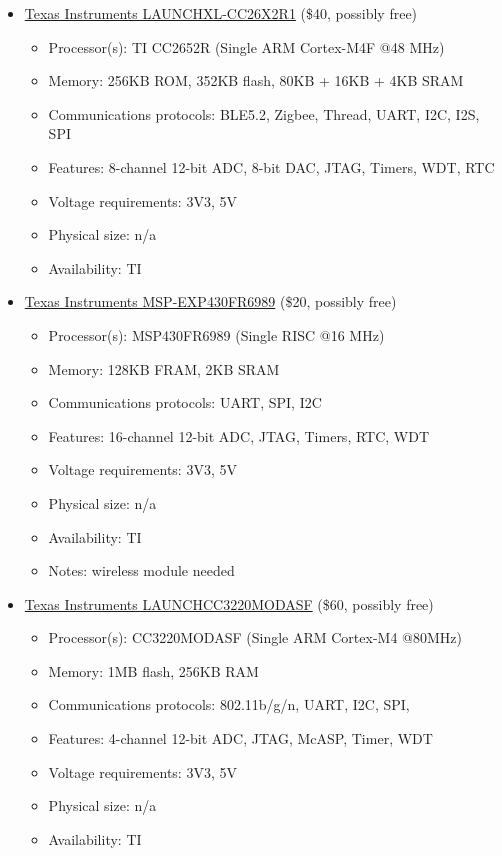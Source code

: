 \begin{itemize}
    \item
    \href{https://www.ti.com/tool/LAUNCHXL-CC26X2R1}{Texas Instruments LAUNCHXL-CC26X2R1} (\$40,
    possibly free)
    \begin{itemize}
        \item Processor(s): TI CC2652R (Single ARM Cortex-M4F @48 MHz)
        \item Memory: 256KB ROM, 352KB flash, 80KB + 16KB + 4KB SRAM
        \item Communications protocols: BLE5.2, Zigbee, Thread, UART, I2C, I2S, SPI
        \item Features: 8-channel 12-bit ADC, 8-bit DAC, JTAG, Timers, WDT, RTC
        \item Voltage requirements: 3V3, 5V
        \item Physical size: n/a
        \item Availability: TI
    \end{itemize}

    \item
    \href{https://www.ti.com/tool/MSP-EXP430FR6989}{Texas Instruments MSP-EXP430FR6989}
    (\$20, possibly free)
    \begin{itemize}
        \item Processor(s): MSP430FR6989 (Single RISC @16 MHz)
        \item Memory: 128KB FRAM, 2KB SRAM
        \item Communications protocols: UART, SPI, I2C
        \item Features: 16-channel 12-bit ADC, JTAG, Timers, RTC, WDT
        \item Voltage requirements: 3V3, 5V
        \item Physical size: n/a
        \item Availability: TI
        \item Notes: wireless module needed
    \end{itemize}

    \item
    \href{https://www.ti.com/tool/LAUNCHCC3220MODASF}{Texas Instruments LAUNCHCC3220MODASF} (\$60,
    possibly free)
    \begin{itemize}
        \item Processor(s): CC3220MODASF (Single ARM Cortex-M4 @80MHz)
        \item Memory: 1MB flash, 256KB RAM
        \item Communications protocols: 802.11b/g/n, UART, I2C, SPI,
        \item Features: 4-channel 12-bit ADC, JTAG, McASP, Timer, WDT
        \item Voltage requirements: 3V3, 5V
        \item Physical size: n/a
        \item Availability: TI
    \end{itemize}


\end{itemize}
